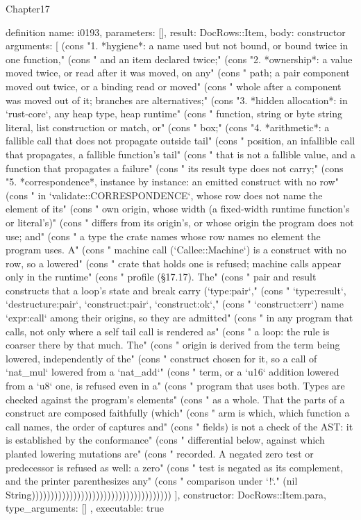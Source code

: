 \begin{lexlean}{Chapter17}
\begin{semanticmodule}
definition{
  name: i0193,
  parameters: [],
  result: DocRows::Item,
  body: constructor{
    arguments: [
      (cons "1. *hygiene*: a name used but not bound, or bound twice in one function," (cons "   and an item declared twice;" (cons "2. *ownership*: a value moved twice, or read after it was moved, on any" (cons "   path; a pair component moved out twice, or a binding read or moved" (cons "   whole after a component was moved out of it; branches are alternatives;" (cons "3. *hidden allocation*: in `rust-core`, any heap type, heap runtime" (cons "   function, string or byte string literal, list construction or match, or" (cons "   box;" (cons "4. *arithmetic*: a fallible call that does not propagate outside tail" (cons "   position, an infallible call that propagates, a fallible function's tail" (cons "   that is not a fallible value, and a function that propagates a failure" (cons "   its result type does not carry;" (cons "5. *correspondence*, instance by instance: an emitted construct with no row" (cons "   in `validate::CORRESPONDENCE`, whose row does not name the element of its" (cons "   own origin, whose width (a fixed-width runtime function's or literal's)" (cons "   differs from its origin's, or whose origin the program does not use; and" (cons "   a type the crate names whose row names no element the program uses. A" (cons "   machine call (`Callee::Machine`) is a construct with no row, so a lowered" (cons "   crate that holds one is refused; machine calls appear only in the runtime" (cons "   profile (§17.17). The" (cons "   pair and result constructs that a loop's state and break carry (`type:pair`," (cons "   `type:result`, `destructure:pair`, `construct:pair`, `construct:ok`," (cons "   `construct:err`) name `expr:call` among their origins, so they are admitted" (cons "   in any program that calls, not only where a self tail call is rendered as" (cons "   a loop: the rule is coarser there by that much. The" (cons "   origin is derived from the term being lowered, independently of the" (cons "   construct chosen for it, so a call of `nat_mul` lowered from a `nat_add`" (cons "   term, or a `u16` addition lowered from a `u8` one, is refused even in a" (cons "   program that uses both. Types are checked against the program's elements" (cons "   as a whole. That the parts of a construct are composed faithfully (which" (cons "   arm is which, which function a call names, the order of captures and" (cons "   fields) is not a check of the AST: it is established by the conformance" (cons "   differential below, against which planted lowering mutations are" (cons "   recorded. A negated zero test or predecessor is refused as well: a zero" (cons "   test is negated as its complement, and the printer parenthesizes any" (cons "   comparison under `!`." (nil String)))))))))))))))))))))))))))))))))))))
    ],
    constructor: DocRows::Item.para,
    type_arguments: []
  },
  executable: true
}


\end{semanticmodule}
\end{lexlean}
